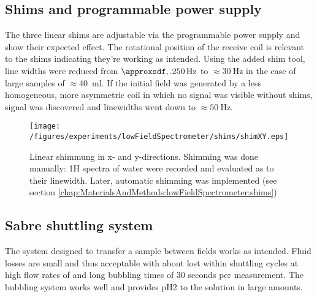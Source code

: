        \subsection{Shims and programmable power supply}
            The three linear shims are adjustable via the programmable power supply and show
            their expected effect. The rotational position of the receive coil is relevant to the
            shims indicating they're working as intended. Using the added shim tool, line widths
            were reduced from $\approxsdf,.
            \SI{250}{\hertz}$ to $\approx \SI{30}{\hertz}$ in the case of large samples of $\approx
            $\SI{40}{\milli\litre}. If the initial field was generated by a less homogeneous, more
            asymmetric coil in which no signal was visible without shims, signal was discovered and linewidths went down to
            $\approx \SI{50}{\hertz}$.
            \begin{figure}[h]
                \label{fig:results:lowFieldSpectrometer:shims}
                \texttt{[image: /figures/experiments/lowFieldSpectrometer/shims/shimXY.eps]}
                \caption[Manual low field shimming]{Linear shimmung in x- and y-directions. Shimming was done manually: 1H spectra of water were recorded and evaluated as to their linewidth. Later, automatic shimming was implemented (see section \ref{chap:MaterialsAndMethods:lowFieldSpectrometer:shims})}
            \end{figure}
    \subsection{Sabre shuttling system}
        The system designed to transfer a sample between fields works as intended. Fluid losses are
        small and thus acceptable with about  lost within  shuttling cycles at high flow rates of  and long bubbling times of 30 seconds per measurement. The
        bubbling system works well and provides pH2 to the solution in large amounts. 
